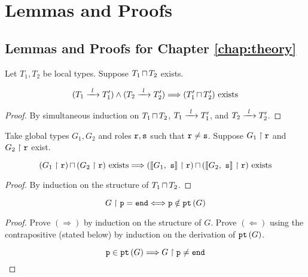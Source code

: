 \chapter{Lemmas and Proofs}

\section{Lemmas and Proofs for Chapter \ref{chap:theory}}
\label{section:proofs}

\begin{lemma}
Let $T_1, T_2$ be local types.
Suppose ${T_1}\,{\sqcap}\,{T_2}$ exists.

\[
(\treduce{T_1}{T'_1}{l}) \wedge (\treduce{T_2}{T'_2}{l})
	\Longrightarrow
(\tmerge{T'_1}{T'_2}) \text{ exists}
\]

\label{lem:localltspreservemerge}
\end{lemma}

\begin{proof}
By simultaneous induction on
${T_1}\,{\sqcap}\,{T_2}$, $\treduce{T_1}{T'_1}{l}$,
and $\treduce{T_2}{T'_2}{l}$.

\end{proof}

\begin{lemma}
Take global types $G_1, G_2$
and roles ${\mathtt{r}}, {\mathtt{s}}$ such that ${\mathtt{r}} \neq {\mathtt{s}}$.
Suppose ${G_1} \upharpoonright {\mathtt{r}}$ and ${G_2} \upharpoonright {\mathtt{r}}$ exist.

\[
{({G_1} \upharpoonright {\mathtt{r}})}\,{\sqcap}\,{({G_2} \upharpoonright {\mathtt{r}})} \text{ exists}
	\Longrightarrow
{( { \llbracket {G_1},~ {\mathtt{s}}  \rrbracket } \upharpoonright {\mathtt{r}}  )}\,{\sqcap}\,{({\llbracket {G_2},~{\mathtt{s}} \rrbracket} \upharpoonright {\mathtt{r}})} 
	\text{ exists}
\]

\label{lem:encglobalpreservemerge}
\end{lemma}

\begin{proof}
By induction on the structure of ${T_1}\,{\sqcap}\,{T_2}$.

\end{proof}

\begin{lemma}

\[
{G} \upharpoonright {\mathtt{p}} = \textnormal{\texttt{end}} \Longleftrightarrow {\mathtt{p}} \notin {\textnormal{\texttt{pt}}\left({G}\right)}
\]

\label{lem:projpt}
\end{lemma}

\begin{proof} 
Prove $(\Longrightarrow)$ by induction on the structure of $G$.
Prove $(\Longleftarrow)$ using the contrapositive (stated below)
by induction on the derivation of ${\textnormal{\texttt{pt}}\left({G}\right)}$.

\[
{\mathtt{p}} \in {\textnormal{\texttt{pt}}\left({G}\right)} \Longrightarrow {G} \upharpoonright {\mathtt{p}} \neq \textnormal{\texttt{end}}
\]
\end{proof}

